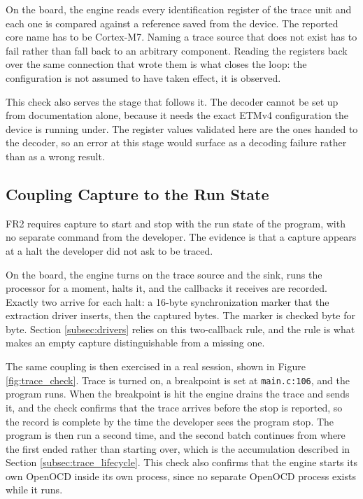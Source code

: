 On the board, the engine reads every identification register of the trace unit and each one is compared against a reference saved from the device. The reported core name has to be Cortex-M7. Naming a trace source that does not exist has to fail rather than fall back to an arbitrary component. Reading the registers back over the same connection that wrote them is what closes the loop: the configuration is not assumed to have taken effect, it is observed.

This check also serves the stage that follows it. The decoder cannot be set up from documentation alone, because it needs the exact ETMv4 configuration the device is running under. The register values validated here are the ones handed to the decoder, so an error at this stage would surface as a decoding failure rather than as a wrong result.

\subsection{Coupling Capture to the Run State}
\label{subsec:val_runstate}
\label{subsec:launch_check}
FR2 requires capture to start and stop with the run state of the program, with no separate command from the developer. The evidence is that a capture appears at a halt the developer did not ask to be traced.

On the board, the engine turns on the trace source and the sink, runs the processor for a moment, halts it, and the callbacks it receives are recorded. Exactly two arrive for each halt: a 16-byte synchronization marker that the extraction driver inserts, then the captured bytes. The marker is checked byte for byte. Section \ref{subsec:drivers} relies on this two-callback rule, and the rule is what makes an empty capture distinguishable from a missing one.

The same coupling is then exercised in a real session, shown in Figure \ref{fig:trace_check}. Trace is turned on, a breakpoint is set at \texttt{main.c:106}, and the program runs. When the breakpoint is hit the engine drains the trace and sends it, and the check confirms that the trace arrives before the stop is reported, so the record is complete by the time the developer sees the program stop. The program is then run a second time, and the second batch continues from where the first ended rather than starting over, which is the accumulation described in Section \ref{subsec:trace_lifecycle}. This check also confirms that the engine starts its own OpenOCD inside its own process, since no separate OpenOCD process exists while it runs.

